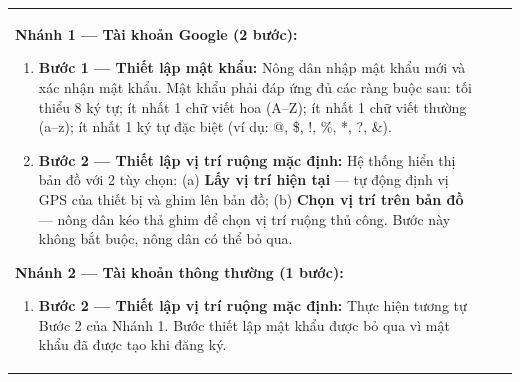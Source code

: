 \documentclass[12pt,a4paper]{article}
\begin{document}
\begin{longtable}{|
        >{\raggedright\arraybackslash}p{2.2cm}|
        >{\raggedright\arraybackslash}p{2.8cm}|
        >{\raggedright\arraybackslash}p{9.8cm}|}
    \textbf{Nhánh 1 --- Tài khoản Google (2 bước):}
    \begin{enumerate}[leftmargin=*,topsep=2pt,itemsep=1pt]
        \item \textbf{Bước 1 --- Thiết lập mật khẩu:} Nông dân nhập mật khẩu mới và xác nhận mật khẩu. Mật khẩu phải đáp ứng đủ các ràng buộc sau: tối thiểu 8 ký tự; ít nhất 1 chữ viết hoa (A--Z); ít nhất 1 chữ viết thường (a--z); ít nhất 1 ký tự đặc biệt (ví dụ: @, \$, !, \%, *, ?, \&).
        \item \textbf{Bước 2 --- Thiết lập vị trí ruộng mặc định:} Hệ thống hiển thị bản đồ với 2 tùy chọn: (a) \textbf{Lấy vị trí hiện tại} --- tự động định vị GPS của thiết bị và ghim lên bản đồ; (b) \textbf{Chọn vị trí trên bản đồ} --- nông dân kéo thả ghim để chọn vị trí ruộng thủ công. Bước này không bắt buộc, nông dân có thể bỏ qua.
    \end{enumerate}

    \textbf{Nhánh 2 --- Tài khoản thông thường (1 bước):}
    \begin{enumerate}[leftmargin=*,topsep=2pt,itemsep=1pt]
        \item \textbf{Bước 2 --- Thiết lập vị trí ruộng mặc định:} Thực hiện tương tự Bước 2 của Nhánh 1. Bước thiết lập mật khẩu được bỏ qua vì mật khẩu đã được tạo khi đăng ký.
    \end{enumerate}


\end{longtable}
\end{document}
